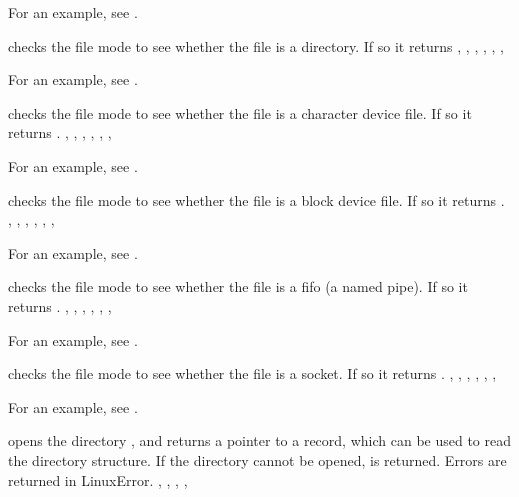 For an example, see .

{  checks the file mode  to see whether the file is a
directory. If so it returns 
}
{,
 , 
 ,
 ,
 ,
 ,
}

For an example, see .

{  checks the file mode  to see whether the file is a
character device file. If so it returns .
}
{,
 , 
 ,
 ,
 ,
 ,
}

For an example, see .

{  checks the file mode  to see whether the file is a
block device file. If so it returns .
}
{,
 , 
 ,
 ,
 ,
 ,
}

For an example, see .

{  checks the file mode  to see whether the file is a
fifo (a named pipe). If so it returns .
}
{,
 , 
 ,
 ,
 ,
 ,
}

For an example, see .

{  checks the file mode  to see whether the file is a
socket. If so it returns .
}
{,
 , 
 ,
 ,
 ,
 ,
}


For an example, see .

{  opens the directory  , and returns a 
pointer to a  record, which can be used to read the directory 
structure. If the directory cannot be opened,  is returned.}
{Errors are returned in LinuxError.}
{, , , ,
}

